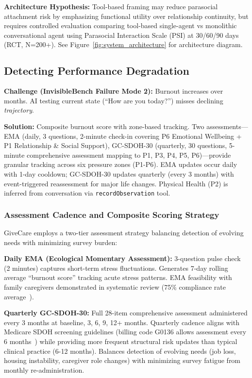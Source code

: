 \documentclass{article}
\begin{document}
\textbf{Architecture Hypothesis:} Tool-based framing may reduce parasocial attachment risk by emphasizing functional utility over relationship continuity, but requires controlled evaluation comparing tool-based single-agent vs monolithic conversational agent using Parasocial Interaction Scale (PSI) at 30/60/90 days (RCT, N=200+). See Figure~\ref{fig:system_architecture} for architecture diagram.
%
\subsection{Detecting Performance Degradation}%
\label{subsec:DetectingPerformanceDegradation}%
\textbf{Challenge (InvisibleBench Failure Mode 2):} Burnout increases over months. AI testing current state (``How are you today?'') misses declining \textit{trajectory}.

\textbf{Solution:} Composite burnout score with zone-based tracking. Two assessments—EMA (daily, 3 questions, 2-minute check-in covering P6 Emotional Wellbeing + P1 Relationship \& Social Support), GC-SDOH-30 (quarterly, 30 questions, 5-minute comprehensive assessment mapping to P1, P3, P4, P5, P6)—provide granular tracking across six pressure zones (P1-P6). EMA updates occur daily with 1-day cooldown; GC-SDOH-30 updates quarterly (every 3 months) with event-triggered reassessment for major life changes. Physical Health (P2) is inferred from conversation via \texttt{recordObservation} tool.

\subsubsection{Assessment Cadence and Composite Scoring Strategy}
GiveCare employs a two-tier assessment strategy balancing detection of evolving needs with minimizing survey burden:

\textbf{Daily EMA (Ecological Momentary Assessment):} 3-question pulse check (2 minutes) captures short-term stress fluctuations. Generates 7-day rolling average ``burnout score'' tracking acute stress patterns. EMA feasibility with family caregivers demonstrated in systematic review (75\% compliance rate average~\cite{han2024ema}).

\textbf{Quarterly GC-SDOH-30:} Full 28-item comprehensive assessment administered every 3 months at baseline, 3, 6, 9, 12+ months. Quarterly cadence aligns with Medicare SDOH screening guidelines (billing code G0136 allows assessment every 6 months~\cite{cms-g0136}) while providing more frequent structural risk updates than typical clinical practice (6-12 months). Balances detection of evolving needs (job loss, housing instability, caregiver role changes) with minimizing survey fatigue from monthly re-administration.
\end{document}

